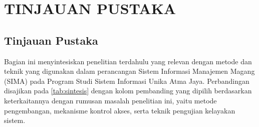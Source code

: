 
\chapter{TINJAUAN PUSTAKA}

\section{Tinjauan Pustaka}

%

Bagian ini menyintesiskan penelitian terdahulu yang relevan dengan metode dan 
teknik yang digunakan dalam perancangan Sistem Informasi Manajemen Magang (SIMA) 
pada Program Studi Sistem Informasi Unika Atma Jaya. Perbandingan disajikan pada 
\cref{tab:sintesis} dengan kolom pembanding yang dipilih berdasarkan keterkaitannya dengan 
rumusan masalah penelitian ini, yaitu metode pengembangan, mekanisme kontrol akses, 
serta teknik pengujian kelayakan sistem.

